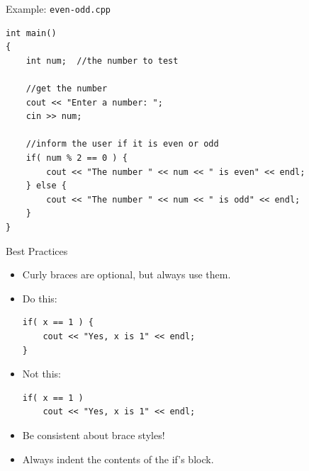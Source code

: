 \documentclass[]{beamer}
\begin{document}
\begin{frame}[fragile]{Example: \texttt{even-odd.cpp}}
\begin{adjustbox}{max height=0.9\textheight, max width=0.95\textwidth}
\begin{BVerbatim}
int main()
{
    int num;  //the number to test

    //get the number
    cout << "Enter a number: ";
    cin >> num;

    //inform the user if it is even or odd 
    if( num % 2 == 0 ) {
        cout << "The number " << num << " is even" << endl;
    } else {
        cout << "The number " << num << " is odd" << endl;
    }
}
\end{BVerbatim}
\end{adjustbox}
\end{frame}

\begin{frame}[fragile]{Best Practices}
    \begin{itemize}[<+->]
        \item Curly braces are optional, but always use them.

        \item Do this:
        \newline\begin{BVerbatim}
if( x == 1 ) {
    cout << "Yes, x is 1" << endl;
}
        \end{BVerbatim}

        \item Not this:
        \newline\begin{BVerbatim}
if( x == 1 ) 
    cout << "Yes, x is 1" << endl;
        \end{BVerbatim}

        \item Be consistent about brace styles!

        \item Always indent the contents of the if's block.
    \end{itemize}
\end{frame}
\end{document}
